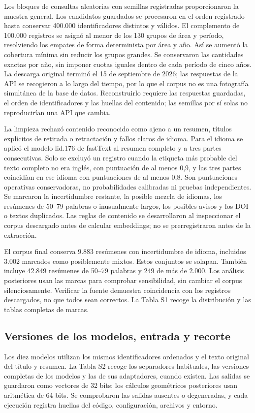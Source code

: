\documentclass[12pt]{article}
\begin{document}
Los bloques de consultas aleatorias con semillas registradas proporcionaron la muestra general. Los candidatos guardados se procesaron en el orden registrado hasta conservar 400.000 identificadores distintos y válidos. El complemento de 100.000 registros se asignó al menor de los 130 grupos de área y período, resolviendo los empates de forma determinista por área y año. Así se aumentó la cobertura mínima sin reducir los grupos grandes. Se conservaron las cantidades exactas por año, sin imponer cuotas iguales dentro de cada período de cinco años. La descarga original terminó el 15 de septiembre de 2026; las respuestas de la API se recogieron a lo largo del tiempo, por lo que el corpus no es una fotografía simultánea de la base de datos. Reconstruirlo requiere las respuestas guardadas, el orden de identificadores y las huellas del contenido; las semillas por sí solas no reproducirían una API que cambia.

La limpieza rechazó contenido reconocido como ajeno a un resumen, títulos explícitos de retirada o retractación y fallos claros de idioma. Para el idioma se aplicó el modelo lid.176 de fastText al resumen completo y a tres partes consecutivas. Solo se excluyó un registro cuando la etiqueta más probable del texto completo no era inglés, con puntuación de al menos 0,9, y las tres partes coincidían en ese idioma con puntuaciones de al menos 0,8. Son puntuaciones operativas conservadoras, no probabilidades calibradas ni pruebas independientes. Se marcaron la incertidumbre restante, la posible mezcla de idiomas, los resúmenes de 50--79 palabras o inusualmente largos, los posibles avisos y los DOI o textos duplicados. Las reglas de contenido se desarrollaron al inspeccionar el corpus descargado antes de calcular embeddings; no se prerregistraron antes de la extracción.

El corpus final conserva 9.883 resúmenes con incertidumbre de idioma, incluidos 3.002 marcados como posiblemente mixtos. Estos conjuntos se solapan. También incluye 42.849 resúmenes de 50--79 palabras y 249 de más de 2.000. Los análisis posteriores usan las marcas para comprobar sensibilidad, sin cambiar el corpus silenciosamente. Verificar la fuente demuestra coincidencia con los registros descargados, no que todos sean correctos. La Tabla S1 recoge la distribución y las tablas completas de marcas.
\clearpage

\FloatBarrier
\subsection{Versiones de los modelos, entrada y recorte}
Los diez modelos utilizan los mismos identificadores ordenados y el texto original del título y resumen. La Tabla S2 recoge los separadores habituales, las versiones completas de los modelos y las de sus adaptadores, cuando existen. Las salidas se guardaron como vectores de 32 bits; los cálculos geométricos posteriores usan aritmética de 64 bits. Se comprobaron las salidas ausentes o degeneradas, y cada ejecución registra huellas del código, configuración, archivos y entorno.
\end{document}
